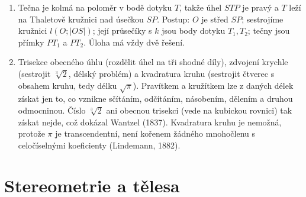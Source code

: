 \begin{enumerate}[label=\textbf{\arabic*.}, leftmargin=*, itemsep=0.8em]
  \item {}
  Tečna je kolmá na poloměr v bodě dotyku $T$, takže úhel $STP$ je pravý a $T$ leží na Thaletově kružnici nad úsečkou $SP$. Postup: $O$ je střed $SP$; sestrojíme kružnici $l(O; |OS|)$; její průsečíky s $k$ jsou body dotyku $T_1, T_2$; tečny jsou přímky $PT_1$ a $PT_2$. Úloha má vždy dvě řešení.
  \begin{center}
  \end{center}

  \item {}
  Trisekce obecného úhlu (rozdělit úhel na tři shodné díly), zdvojení krychle (sestrojit $\sqrt[3]{2}$, délský problém) a kvadratura kruhu (sestrojit čtverec s obsahem kruhu, tedy délku $\sqrt{\pi}$). Pravítkem a kružítkem lze z daných délek získat jen to, co vznikne sčítáním, odčítáním, násobením, dělením a druhou odmocninou. Číslo $\sqrt[3]{2}$ ani obecnou trisekci (vede na kubickou rovnici) tak získat nejde, což dokázal Wantzel (1837). Kvadratura kruhu je nemožná, protože $\pi$ je transcendentní, není kořenem žádného mnohočlenu s celočíselnými koeficienty (Lindemann, 1882). 
\end{enumerate}

\section{Stereometrie a tělesa}


